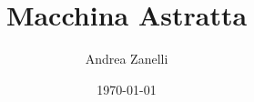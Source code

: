 \documentclass[a4paper,11pt]{article}
\title{Macchina Astratta}
\author{Andrea Zanelli}
\date{\today}
\begin{document}
\maketitle
\pagebreak

\tableofcontents
\pagebreak

















%

\end{document}
